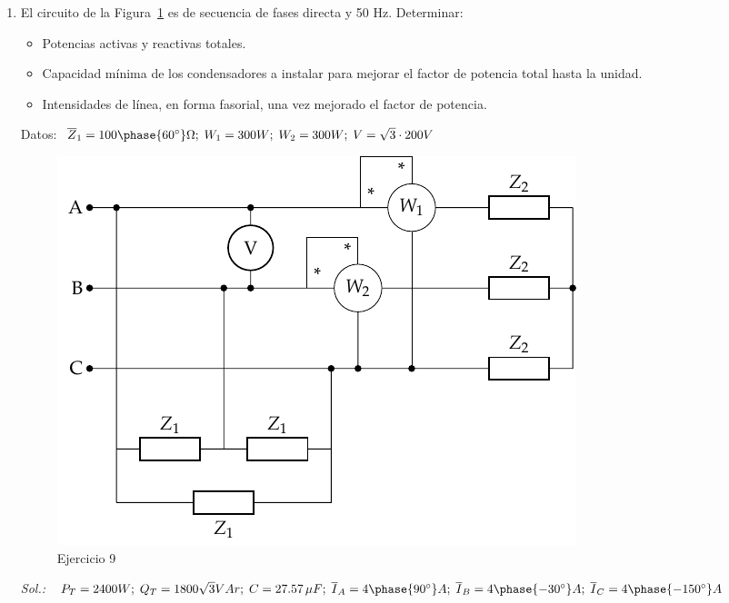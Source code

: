 \begin{enumerate}
\begin{itemize}
\begin{itemize}
    \item Calcular el {valor eficaz} de la corriente de línea total.
    \item Calcular el triángulo de potencias a la entrada de la línea.
    \item Calcular el {valor eficaz} de la tensión a la entrada de la
      línea.
    \item Determinar la lectura de los vatímetros descritos
      anteriormente.
    \end{itemize}
  \end{itemize}
  \emph{Sol.:
    $P_1 = {30}{kW};\; Q_1 = {24.07}{kVAr};\; S_1={38.46}{kVA};\; P_2
    = {7.5}{kW};\; Q_2 = {8.31}{kVAr};\; S_2 ={11.19}{kVA}; P_T=
    {37.5}{kW}; \;Q_T= {32.38}{kVAr};\; S_T = {49.55}{kVA};\; I_1 =
    {55.51}{A};\; I_2 = {16.15}{A};\; I_T= {71.52}{A};\; W_{A,AC} =
    {28.10}{kW}; \; W_{B,BC} = {9.40}{kW};\;W_{C, BA} =-
    {18.69}{kW};\; P_g = {39.74}{kW};\; Q_g= {32.38}{kVAr};\; S_g =
    {51.26}{kVA};\;U_g = {413.81}{V};\; C = {214.7}{\mu F/fase};\;
    I_T' = {54.13}{A};\; P_g' = {38.78}{kW};\; Q_g' = {0}{VAr};\; S_g'
    ={38.78}{kVA};\; U' = {413.66}{V};\; W_{A,AC}' = {18.75}{kW};\;
    W_{B,BC}' = {18.75}{kW};\; W'_{C,BA} = {0}{W}$ }
 
\item El circuito de la Figura~\ref{fig.ej9_BT3} es de secuencia de
  fases directa y 50 Hz. Determinar:
  \begin{itemize}
  \item Potencias activas y reactivas totales.
  \item Capacidad mínima de los condensadores a instalar para mejorar
    el factor de potencia total hasta la unidad.
  \item Intensidades de línea, en forma fasorial, una vez mejorado el
    factor de potencia.
  \end{itemize}
  Datos:
  $\overline{Z}_1 = {100\phase{{60}^\circ}}{\Omega};\; W_1 =
  {300}{W};\; W_2 = {300}{W};\; V= {\sqrt{3} \cdot 200}{V}$
  \begin{figure}[H]
    \centering
    \includegraphics[width=0.5\linewidth]{../figs/ej9_BT3.pdf}
    \caption{Ejercicio 9}
    \label{fig.ej9_BT3}
  \end{figure}
  \emph{Sol.:
    $P_T = {2400} W;\; Q_T =1800\sqrt{3}{VAr};\; C=27.57\,\mu
    F;\;\overline{I}_A = {4\phase{{90^\circ}}}{A}; \;
    \overline{I}_B={4\phase{{-30^\circ}}}{A};\; \overline{I}_C
    ={4\phase{{-150^\circ}}}{A}$}

\end{enumerate}

